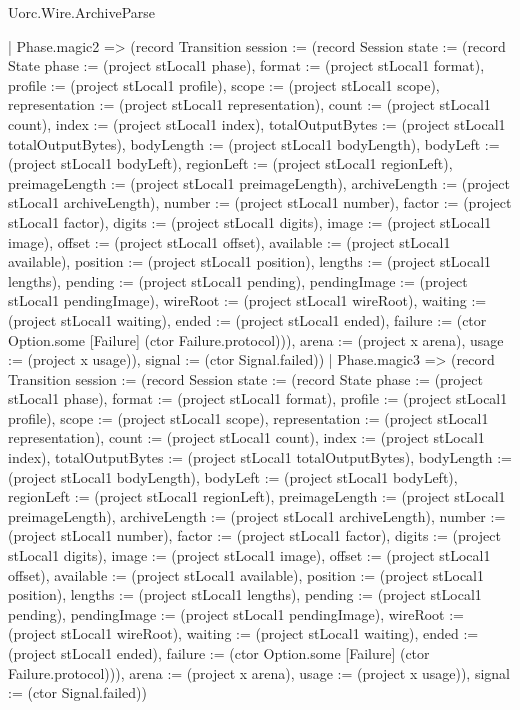 \begin{lexlean}{Uorc.Wire.ArchiveParse}
\begin{semanticmodule}
{    | Phase.magic2 => (record Transition {session := (record Session {state := (record State {phase := (project stLocal1 phase), format := (project stLocal1 format), profile := (project stLocal1 profile), scope := (project stLocal1 scope), representation := (project stLocal1 representation), count := (project stLocal1 count), index := (project stLocal1 index), totalOutputBytes := (project stLocal1 totalOutputBytes), bodyLength := (project stLocal1 bodyLength), bodyLeft := (project stLocal1 bodyLeft), regionLeft := (project stLocal1 regionLeft), preimageLength := (project stLocal1 preimageLength), archiveLength := (project stLocal1 archiveLength), number := (project stLocal1 number), factor := (project stLocal1 factor), digits := (project stLocal1 digits), image := (project stLocal1 image), offset := (project stLocal1 offset), available := (project stLocal1 available), position := (project stLocal1 position), lengths := (project stLocal1 lengths), pending := (project stLocal1 pending), pendingImage := (project stLocal1 pendingImage), wireRoot := (project stLocal1 wireRoot), waiting := (project stLocal1 waiting), ended := (project stLocal1 ended), failure := (ctor Option.some [Failure] (ctor Failure.protocol))}), arena := (project x arena), usage := (project x usage)}), signal := (ctor Signal.failed)})
    | Phase.magic3 => (record Transition {session := (record Session {state := (record State {phase := (project stLocal1 phase), format := (project stLocal1 format), profile := (project stLocal1 profile), scope := (project stLocal1 scope), representation := (project stLocal1 representation), count := (project stLocal1 count), index := (project stLocal1 index), totalOutputBytes := (project stLocal1 totalOutputBytes), bodyLength := (project stLocal1 bodyLength), bodyLeft := (project stLocal1 bodyLeft), regionLeft := (project stLocal1 regionLeft), preimageLength := (project stLocal1 preimageLength), archiveLength := (project stLocal1 archiveLength), number := (project stLocal1 number), factor := (project stLocal1 factor), digits := (project stLocal1 digits), image := (project stLocal1 image), offset := (project stLocal1 offset), available := (project stLocal1 available), position := (project stLocal1 position), lengths := (project stLocal1 lengths), pending := (project stLocal1 pending), pendingImage := (project stLocal1 pendingImage), wireRoot := (project stLocal1 wireRoot), waiting := (project stLocal1 waiting), ended := (project stLocal1 ended), failure := (ctor Option.some [Failure] (ctor Failure.protocol))}), arena := (project x arena), usage := (project x usage)}), signal := (ctor Signal.failed)})
}
\end{semanticmodule}
\end{lexlean}
